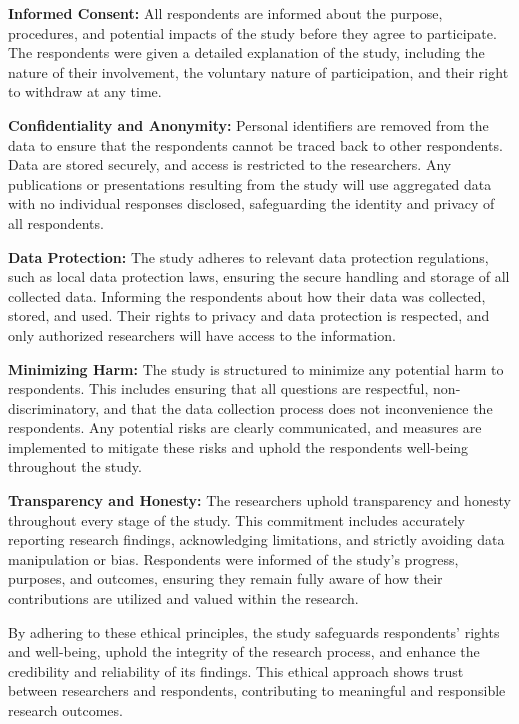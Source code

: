	\textbf{Informed Consent:} All respondents are informed about the purpose, procedures, and potential impacts of the study before they agree to participate. The respondents were given a detailed explanation of the study, including the nature of their involvement, the voluntary nature of participation, and their right to withdraw at any time.
	
	\textbf{Confidentiality and Anonymity:} Personal identifiers are removed from the data to ensure that the respondents cannot be traced back to other respondents. Data are stored securely, and access is restricted to the researchers. Any publications or presentations resulting from the study will use aggregated data with no individual responses disclosed, safeguarding the identity and privacy of all respondents.
	
	\textbf{Data Protection:} The study adheres to relevant data protection regulations, such as local data protection laws, ensuring the secure handling and storage of all collected data. Informing the respondents about how their data was collected, stored, and used. Their rights to privacy and data protection is respected, and only authorized researchers will have access to the information.
	
	\textbf{Minimizing Harm:} The study is structured to minimize any potential harm to respondents. This includes ensuring that all questions are respectful, non-discriminatory, and that the data collection process does not inconvenience the respondents. Any potential risks are clearly communicated, and measures are implemented to mitigate these risks and uphold the respondents well-being throughout the study.
	
	\textbf{Transparency and Honesty: } The researchers uphold transparency and honesty throughout every stage of the study. This commitment includes accurately reporting research findings, acknowledging limitations, and strictly avoiding data manipulation or bias. Respondents were informed of the study's progress, purposes, and outcomes, ensuring they remain fully aware of how their contributions are utilized and valued within the research.
	
	By adhering to these ethical principles, the study safeguards respondents' rights and well-being, uphold the integrity of the research process, and enhance the credibility and reliability of its findings. This ethical approach shows trust between researchers and respondents, contributing to meaningful and responsible research outcomes.
